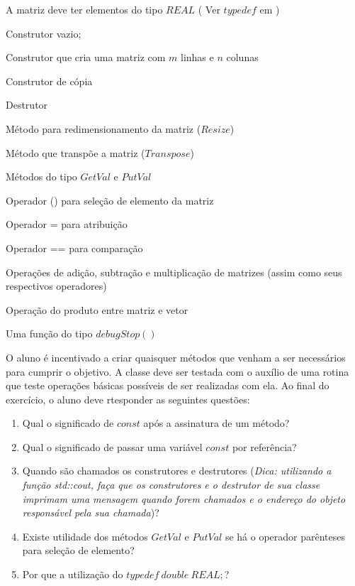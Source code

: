 \documentclass[11pt, oneside, hidelinks]{article}   	%
\begin{document}
\begin{itemize}
\begin{samepage}
\item A matriz deve ter elementos do tipo $REAL$ ( Ver $typedef$ em \citet{deitel12})
\item Construtor vazio;    
\item Construtor que cria uma matriz com $m$ linhas e $n$ colunas
\item Construtor de cópia
\item Destrutor
\item Método para redimensionamento da matriz ($Resize$)
\item Método que transpõe a matriz ($Transpose$)
\item Métodos do tipo $GetVal$ e $PutVal$
\item Operador () para seleção de elemento da matriz
\item Operador = para atribuição
\item Operador == para comparação
\item Operações de adição, subtração e multiplicação de matrizes (assim como seus respectivos operadores)
\item Operação do produto entre matriz e vetor
\item Uma função do tipo $debugStop()$
\end{samepage}
\end{itemize}
O aluno é incentivado a criar quaisquer métodos que venham a ser necessários para cumprir o objetivo. A classe deve ser testada com o auxílio de uma rotina que teste operações básicas possíveis de ser realizadas com ela. Ao final do exercício, o aluno deve rtesponder as seguintes questões:
\begin{enumerate}
  \item Qual o significado de $const$ após a assinatura de um método?
  \item Qual o significado de passar uma variável $const$ por referência?
  \item Quando são chamados os construtores e destrutores (\emph{Dica: utilizando a função std::cout, faça que os construtores e o destrutor de sua classe imprimam uma mensagem quando forem chamados e o endereço do objeto responsável pela sua chamada})?
  \item Existe utilidade dos métodos $GetVal$ e $PutVal$ se há o operador parênteses para seleção de elemento?
  \item Por que a utilização do $typedef\ double\ REAL;$?
\end{enumerate}
\newpage
\end{document}
